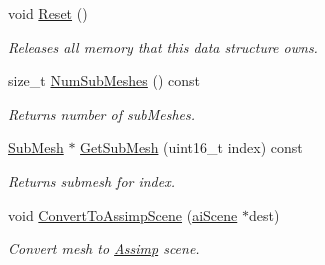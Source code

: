 \begin{DoxyCompactItemize}
\item 
\hypertarget{class_assimp_1_1_ogre_1_1_mesh_a782d0d44bd007d4118fb277b7052a5b8}{void \hyperlink{class_assimp_1_1_ogre_1_1_mesh_a782d0d44bd007d4118fb277b7052a5b8}{Reset} ()}\label{class_assimp_1_1_ogre_1_1_mesh_a782d0d44bd007d4118fb277b7052a5b8}

\begin{DoxyCompactList}\small\item\em Releases all memory that this data structure owns. \end{DoxyCompactList}\item 
\hypertarget{class_assimp_1_1_ogre_1_1_mesh_aff9090f1d92042d16ce093f4eed0d18b}{size\+\_\+t \hyperlink{class_assimp_1_1_ogre_1_1_mesh_aff9090f1d92042d16ce093f4eed0d18b}{Num\+Sub\+Meshes} () const }\label{class_assimp_1_1_ogre_1_1_mesh_aff9090f1d92042d16ce093f4eed0d18b}

\begin{DoxyCompactList}\small\item\em Returns number of sub\+Meshes. \end{DoxyCompactList}\item 
\hypertarget{class_assimp_1_1_ogre_1_1_mesh_a20ce3eaad8d0f6645c86d1bb62b15632}{\hyperlink{class_assimp_1_1_ogre_1_1_sub_mesh}{Sub\+Mesh} $\ast$ \hyperlink{class_assimp_1_1_ogre_1_1_mesh_a20ce3eaad8d0f6645c86d1bb62b15632}{Get\+Sub\+Mesh} (uint16\+\_\+t index) const }\label{class_assimp_1_1_ogre_1_1_mesh_a20ce3eaad8d0f6645c86d1bb62b15632}

\begin{DoxyCompactList}\small\item\em Returns submesh for {\ttfamily index}. \end{DoxyCompactList}\item 
\hypertarget{class_assimp_1_1_ogre_1_1_mesh_ab3dab56c79656dd11e48ef94726185e8}{void \hyperlink{class_assimp_1_1_ogre_1_1_mesh_ab3dab56c79656dd11e48ef94726185e8}{Convert\+To\+Assimp\+Scene} (\hyperlink{structai_scene}{ai\+Scene} $\ast$dest)}\label{class_assimp_1_1_ogre_1_1_mesh_ab3dab56c79656dd11e48ef94726185e8}

\begin{DoxyCompactList}\small\item\em Convert mesh to \hyperlink{class_assimp}{Assimp} scene. \end{DoxyCompactList}\end{DoxyCompactItemize}
